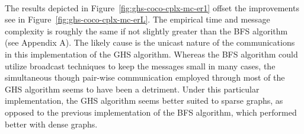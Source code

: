 \documentclass[11pt,epsf]{article}
\begin{document}
{{    \paragraph{}{
      The results depicted in Figure~\ref{fig:ghs-coco-cplx-mc-er1} offset the improvements see in Figure~\ref{fig:ghs-coco-cplx-mc-erL}.
      The empirical time and message complexity is roughly the same if not slightly greater than the BFS algorithm (see Appendix A).
      The likely cause is the unicast nature of the communications in this implementation of the GHS algorithm. Whereas the BFS
      algorithm could utilize broadcast techniques to keep the messages small in many cases, the simultaneous though pair-wise
      communication employed through most of the GHS algorithm seems to have been a detriment. Under this particular implementation,
      the GHS algorithm seems better suited to sparse graphs, as opposed to the previous implementation of the BFS algorithm, which
      performed better with dense graphs.
    }
}}
\end{document}
